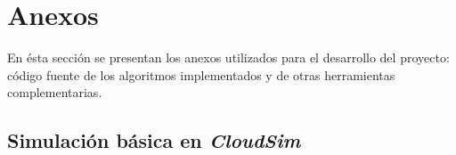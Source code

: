 \chead{}
\rhead{\thepage}



\chapter*{Anexos}


En ésta sección se presentan los anexos utilizados para el desarrollo del  proyecto: código fuente de los algoritmos implementados y de otras herramientas complementarias.

\newpage

\section*{Simulación básica en \textit{CloudSim}}


